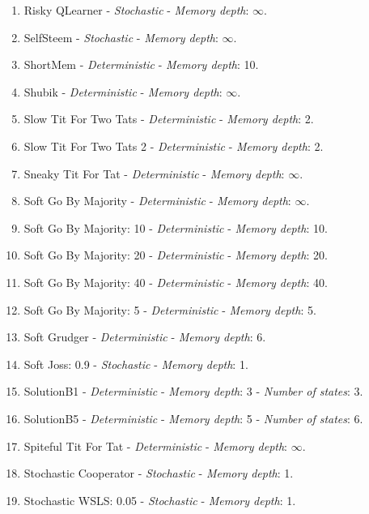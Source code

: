 \documentclass[10pt,letterpaper]{article}
\begin{document}
\begin{enumerate}
\item Risky QLearner - \textit{Stochastic} - \textit{Memory depth}: \(\infty\). \cite{axelrodproject}
\item SelfSteem - \textit{Stochastic} - \textit{Memory depth}: \(\infty\). \cite{Andre2013}
\item ShortMem - \textit{Deterministic} - \textit{Memory depth}: 10. \cite{Andre2013}
\item Shubik - \textit{Deterministic} - \textit{Memory depth}: \(\infty\). \cite{Axelrod1980a}
\item Slow Tit For Two Tats - \textit{Deterministic} - \textit{Memory depth}: 2. \cite{axelrodproject}
\item Slow Tit For Two Tats 2 - \textit{Deterministic} - \textit{Memory depth}: 2. \cite{Prison1998}
\item Sneaky Tit For Tat - \textit{Deterministic} - \textit{Memory depth}: \(\infty\). \cite{axelrodproject}
\item Soft Go By Majority - \textit{Deterministic} - \textit{Memory depth}: \(\infty\). \cite{Axelrod1984, Mittal2009}
\item Soft Go By Majority: 10 - \textit{Deterministic} - \textit{Memory depth}: 10. \cite{axelrodproject}
\item Soft Go By Majority: 20 - \textit{Deterministic} - \textit{Memory depth}: 20. \cite{axelrodproject}
\item Soft Go By Majority: 40 - \textit{Deterministic} - \textit{Memory depth}: 40. \cite{axelrodproject}
\item Soft Go By Majority: 5 - \textit{Deterministic} - \textit{Memory depth}: 5. \cite{axelrodproject}
\item Soft Grudger - \textit{Deterministic} - \textit{Memory depth}: 6. \cite{Li2011}
\item Soft Joss: 0.9 - \textit{Stochastic} - \textit{Memory depth}: 1. \cite{Prison1998}
\item SolutionB1 - \textit{Deterministic} - \textit{Memory depth}: 3 - \textit{Number of states}: 3. \cite{Ashlock2015}
\item SolutionB5 - \textit{Deterministic} - \textit{Memory depth}: 5 - \textit{Number of states}: 6. \cite{Ashlock2015}
\item Spiteful Tit For Tat - \textit{Deterministic} - \textit{Memory depth}: \(\infty\). \cite{Prison1998}
\item Stochastic Cooperator - \textit{Stochastic} - \textit{Memory depth}: 1. \cite{Adami2013}
\item Stochastic WSLS: 0.05 - \textit{Stochastic} - \textit{Memory depth}: 1. \cite{axelrodproject}

\end{enumerate}
\end{document}
